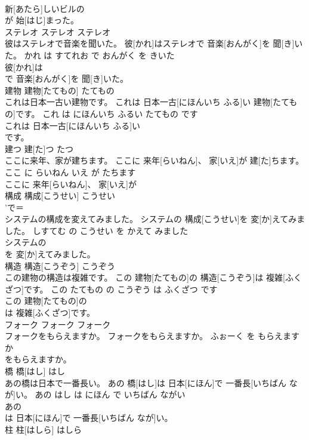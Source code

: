 \documentclass[8pt]{extreport}
\begin{document}
\begin{CJK}{UTF8}{min}
\\	新[あたら]しいビルの
\\	が 始[はじ]まった。			
\\	ステレオ	ステレオ	ステレオ	
\\	彼はステレオで音楽を聞いた。	彼[かれ]はステレオで 音楽[おんがく]を 聞[き]いた。	かれ は すてれお で おんがく を きいた	
\\	彼[かれ]は
\\	で 音楽[おんがく]を 聞[き]いた。			
\\	建物	建物[たてもの]	たてもの	
\\	これは日本一古い建物です。	これは 日本一古[にほんいち ふる]い 建物[たてもの]です。	これ は にほんいち ふるい たてもの です	
\\	これは 日本一古[にほんいち ふる]い
\\	です。			
\\	建つ	建[た]つ	たつ	
\\	ここに来年、家が建ちます。	ここに 来年[らいねん]、 家[いえ]が 建[た]ちます。	ここ に らいねん いえ が たちます	
\\	ここに 来年[らいねん]、 家[いえ]が
\\	構成	構成[こうせい]	こうせい	
\\	'で＝
\\	システムの構成を変えてみました。	システムの 構成[こうせい]を 変[か]えてみました。	しすてむ の こうせい を かえて みました	
\\	システムの
\\	を 変[か]えてみました。			
\\	構造	構造[こうぞう]	こうぞう	
\\	この建物の構造は複雑です。	この 建物[たてもの]の 構造[こうぞう]は 複雑[ふくざつ]です。	この たてもの の こうぞう は ふくざつ です	
\\	この 建物[たてもの]の
\\	は 複雑[ふくざつ]です。			
\\	フォーク	フォーク	フォーク	
\\	フォークをもらえますか。	フォークをもらえますか。	ふぉーく を もらえます か	
\\	をもらえますか。			
\\	橋	橋[はし]	はし	
\\	あの橋は日本で一番長い。	あの 橋[はし]は 日本[にほん]で 一番長[いちばん なが]い。	あの はし は にほん で いちばん ながい	
\\	あの
\\	は 日本[にほん]で 一番長[いちばん なが]い。			
\\	柱	柱[はしら]	はしら	

\end{CJK}
\end{document}
